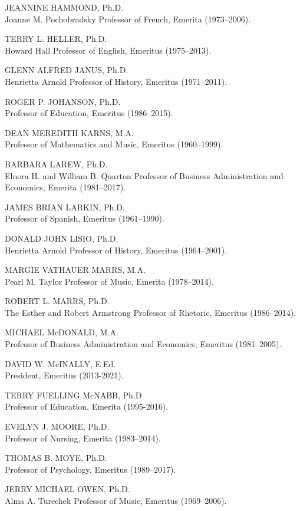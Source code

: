 \documentclass[
  letterpaper,
]{scrbook}
\begin{document}
JEANNINE HAMMOND, Ph.D.\\
Joanne M. Pochobradsky Professor of French, Emerita (1973--2006).

TERRY L. HELLER, Ph.D.\\
Howard Hall Professor of English, Emeritus (1975--2013).

GLENN ALFRED JANUS, Ph.D.\\
Henrietta Arnold Professor of History, Emeritus (1971--2011).

ROGER P. JOHANSON, Ph.D.\\
Professor of Education, Emeritus (1986--2015).

DEAN MEREDITH KARNS, M.A.\\
Professor of Mathematics and Music, Emeritus (1960--1999).

BARBARA LAREW, Ph.D.\\
Elnora H. and William B. Quarton Professor of Business Administration
and Economics, Emerita (1981--2017).

JAMES BRIAN LARKIN, Ph.D.\\
Professor of Spanish, Emeritus (1961--1990).

DONALD JOHN LISIO, Ph.D.\\
Henrietta Arnold Professor of History, Emeritus (1964--2001).

MARGIE VATHAUER MARRS, M.A.\\
Pearl M. Taylor Professor of Music, Emerita (1978--2014).

ROBERT L. MARRS, Ph.D.\\
The Esther and Robert Armstrong Professor of Rhetoric, Emeritus
(1986--2014).

MICHAEL McDONALD, M.A.\\
Professor of Business Administration and Economics, Emeritus
(1981--2005).

DAVID W. McINALLY, E.Ed.\\
President, Emeritus (2013-2021).

TERRY FUELLING McNABB, Ph.D.\\
Professor of Education, Emerita (1995-2016).

EVELYN J. MOORE, Ph.D.\\
Professor of Nursing, Emerita (1983--2014).

THOMAS B. MOYE, Ph.D.\\
Professor of Psychology, Emeritus (1989--2017).

JERRY MICHAEL OWEN, Ph.D.\\
Alma A. Turechek Professor of Music, Emeritus (1969--2006).
\end{document}
